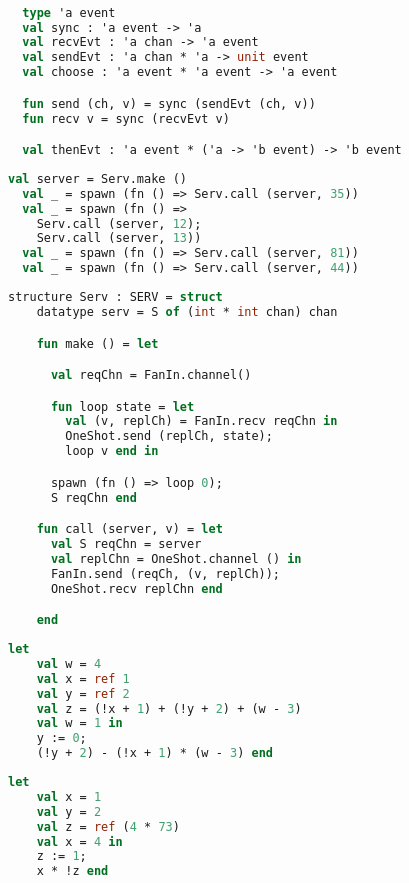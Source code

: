 \documentclass{article}
\begin{document}
\begin{lstlisting}[language=ML, style=codestyle1]

  type 'a event
  val sync : 'a event -> 'a
  val recvEvt : 'a chan -> 'a event
  val sendEvt : 'a chan * 'a -> unit event
  val choose : 'a event * 'a event -> 'a event

  fun send (ch, v) = sync (sendEvt (ch, v))
  fun recv v = sync (recvEvt v)

  val thenEvt : 'a event * ('a -> 'b event) -> 'b event

  \end{lstlisting}

\begin{lstlisting}[language=ML, style=codestyle1]
  val server = Serv.make ()
  val _ = spawn (fn () => Serv.call (server, 35))
  val _ = spawn (fn () => 
    Serv.call (server, 12); 
    Serv.call (server, 13))
  val _ = spawn (fn () => Serv.call (server, 81))
  val _ = spawn (fn () => Serv.call (server, 44))
  \end{lstlisting}

\begin{lstlisting}[language=ML, style=codestyle1]
  structure Serv : SERV = struct 
    datatype serv = S of (int * int chan) chan 

    fun make () = let 

      val reqChn = FanIn.channel()

      fun loop state = let
        val (v, replCh) = FanIn.recv reqChn in 
        OneShot.send (replCh, state);
        loop v end in

      spawn (fn () => loop 0);
      S reqChn end 

    fun call (server, v) = let 
      val S reqChn = server
      val replChn = OneShot.channel () in 
      FanIn.send (reqCh, (v, replCh));
      OneShot.recv replChn end

    end
  \end{lstlisting}

\begin{lstlisting}[language=ML, style=codestyle1]
  let
    val w = 4
    val x = ref 1
    val y = ref 2
    val z = (!x + 1) + (!y + 2) + (w - 3)
    val w = 1 in
    y := 0;
    (!y + 2) - (!x + 1) * (w - 3) end
  \end{lstlisting}

\begin{lstlisting}[language=ML, style=codestyle1]
  let 
    val x = 1  
    val y = 2
    val z = ref (4 * 73)
    val x = 4 in 
    z := 1; 
    x * !z end
  \end{lstlisting}
\end{document}
